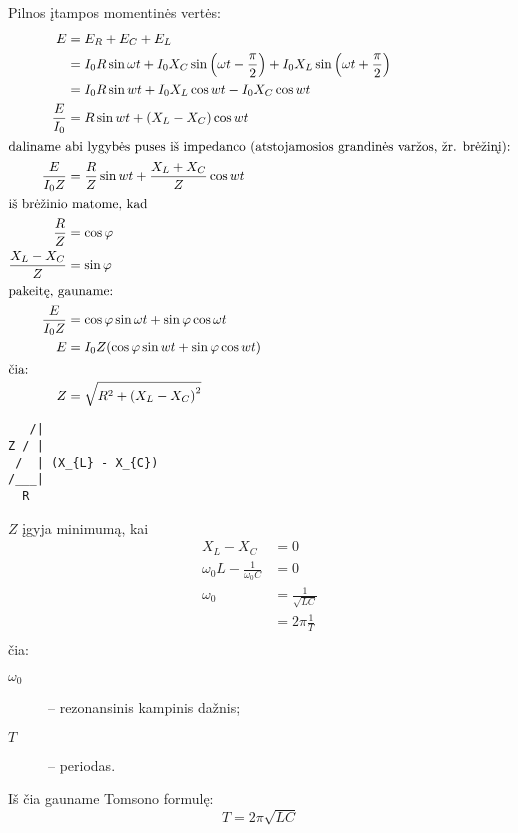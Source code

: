 Pilnos įtampos momentinės vertės:
\begin{align*}
  E
    &= E_{R} + E_{C} + E_{L} \\
    &=  I_{0} R \sin \omega t +
        I_{0} X_{C} \sin \left( \omega t - \frac{\pi}{2} \right) +
        I_{0} X_{L} \sin \left( \omega t + \frac{\pi}{2} \right) \\
    &=  I_{0}R \sin wt + I_{0} X_{L} \cos wt - I_{0} X_{C} \cos wt \\
  \frac{E}{I_{0}}
    &= R \sin wt + (X_{L} - X_{C})\cos wt \\
  \intertext{daliname abi lygybės puses iš impedanco (atstojamosios
  grandinės varžos, žr. brėžinį):}
  \frac{E}{I_{0}Z}
    &= \frac{R}{Z} \sin wt + \frac{X_{L} + X_{C}}{Z} \cos wt \\
  \intertext{iš brėžinio matome, kad}
  \frac{R}{Z}
    &= \cos \varphi \\
  \frac{X_{L} - X_{C}}{Z}
    &= \sin \varphi \\
  \intertext{pakeitę, gauname:}
  \frac{E}{I_{0}Z}
    &= \cos \varphi \sin \omega t + \sin \varphi \cos \omega t \\
  E
    &= I_{0} Z ( \cos \varphi \sin wt + \sin \varphi \cos wt ) \\
  \intertext{čia:}
  Z
    &= \sqrt{R^{2} + \left( X_{L} - X_{C} \right)^{2}} \\
\end{align*}

\begin{verbatim}
   /|
Z / |
 /  | (X_{L} - X_{C})
/___|
  R
\end{verbatim}

$Z$ įgyja minimumą, kai
\begin{align*}
  X_{L} - X_{C}
    &= 0 \\
  \omega_{0} L - \frac{1}{\omega_{0}C}
    &= 0 \\
  \omega_{0}
    &= \frac{1}{\sqrt{LC}} \\
    &= 2 \pi \frac{1}{T} \\
\end{align*}
čia:
\begin{description}
  \item[$\omega_{0}$] – rezonansinis kampinis dažnis;
  \item[$T$] – periodas.
\end{description}

Iš čia gauname Tomsono formulę:
\begin{equation*}
  T = 2 \pi \sqrt{LC}
\end{equation*}

